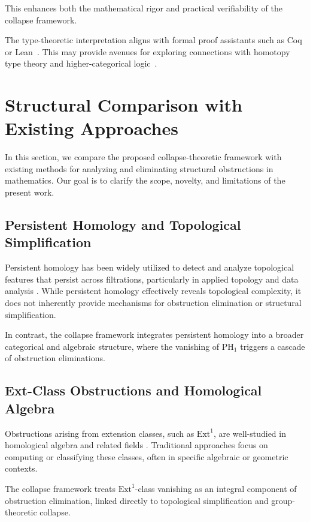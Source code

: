 \documentclass[11pt]{article}
\begin{document}
This enhances both the mathematical rigor and practical verifiability of the collapse framework.

The type-theoretic interpretation aligns with formal proof assistants such as Coq or Lean~\cite{CoqManual2017}. 
This may provide avenues for exploring connections with homotopy type theory and higher-categorical logic~\cite{HOTT2013}.


\section{Structural Comparison with Existing Approaches}

In this section, we compare the proposed collapse-theoretic framework with existing methods for analyzing and eliminating structural obstructions in mathematics. Our goal is to clarify the scope, novelty, and limitations of the present work.

\subsection{Persistent Homology and Topological Simplification}

Persistent homology has been widely utilized to detect and analyze topological features that persist across filtrations, particularly in applied topology and data analysis \cite{Edelsbrunner2008}. While persistent homology effectively reveals topological complexity, it does not inherently provide mechanisms for obstruction elimination or structural simplification.

In contrast, the collapse framework integrates persistent homology into a broader categorical and algebraic structure, where the vanishing of $\mathrm{PH}_1$ triggers a cascade of obstruction eliminations.

\subsection{Ext-Class Obstructions and Homological Algebra}

Obstructions arising from extension classes, such as $\mathrm{Ext}^1$, are well-studied in homological algebra and related fields \cite{Weibel1994}. Traditional approaches focus on computing or classifying these classes, often in specific algebraic or geometric contexts.

The collapse framework treats $\mathrm{Ext}^1$-class vanishing as an integral component of obstruction elimination, linked directly to topological simplification and group-theoretic collapse.
\end{document}
